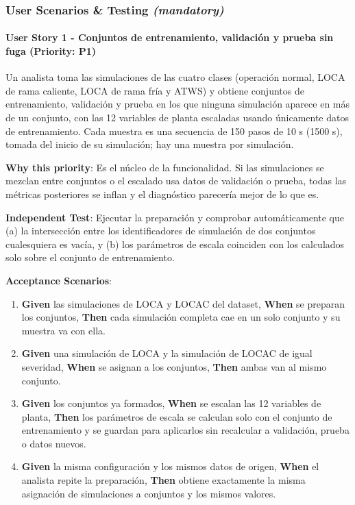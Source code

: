 \documentclass[12pt,a4paper]{article}
\providecommand{\tightlist}{\setlength{\itemsep}{0pt}\setlength{\parskip}{0pt}}
\newenvironment{documentogenerado}[2]{%
  \def\doccomando{#1}\def\docruta{#2}%
  \par\begingroup\small\setstretch{1.15}\sloppy%
}{\endgroup\par\medskip}
\begin{document}
\begin{documentogenerado}{/speckit-specify + /speckit-clarify}{specs\slash 001-preparacion-datos\slash spec.md}
\subsubsection{\texorpdfstring{User Scenarios \& Testing \emph{(mandatory)}}{User Scenarios \& Testing (mandatory)}}

\paragraph{User Story 1 - Conjuntos de entrenamiento, validación y prueba sin fuga (Priority: P1)}

Un analista toma las simulaciones de las cuatro clases (operación normal, LOCA de rama caliente, LOCA de rama fría y ATWS) y obtiene conjuntos de entrenamiento, validación y prueba en los que ninguna simulación aparece en más de un conjunto, con las 12 variables de planta escaladas usando únicamente datos de entrenamiento. Cada muestra es una secuencia de 150 pasos de 10 s (1500 s), tomada del inicio de su simulación; hay una muestra por simulación.

\textbf{Why this priority}: Es el núcleo de la funcionalidad. Si las simulaciones se mezclan entre conjuntos o el escalado usa datos de validación o prueba, todas las métricas posteriores se inflan y el diagnóstico parecería mejor de lo que es.

\textbf{Independent Test}: Ejecutar la preparación y comprobar automáticamente que (a) la intersección entre los identificadores de simulación de dos conjuntos cualesquiera es vacía, y (b) los parámetros de escala coinciden con los calculados solo sobre el conjunto de entrenamiento.

\textbf{Acceptance Scenarios}:

\begin{enumerate}
\def\labelenumi{\arabic{enumi}.}
\tightlist
\item
  \textbf{Given} las simulaciones de LOCA y LOCAC del dataset, \textbf{When} se preparan los conjuntos, \textbf{Then} cada simulación completa cae en un solo conjunto y su muestra va con ella.
\item
  \textbf{Given} una simulación de LOCA y la simulación de LOCAC de igual severidad, \textbf{When} se asignan a los conjuntos, \textbf{Then} ambas van al mismo conjunto.
\item
  \textbf{Given} los conjuntos ya formados, \textbf{When} se escalan las 12 variables de planta, \textbf{Then} los parámetros de escala se calculan solo con el conjunto de entrenamiento y se guardan para aplicarlos sin recalcular a validación, prueba o datos nuevos.
\item
  \textbf{Given} la misma configuración y los mismos datos de origen, \textbf{When} el analista repite la preparación, \textbf{Then} obtiene exactamente la misma asignación de simulaciones a conjuntos y los mismos valores.
\end{enumerate}


\end{documentogenerado}
\end{document}
